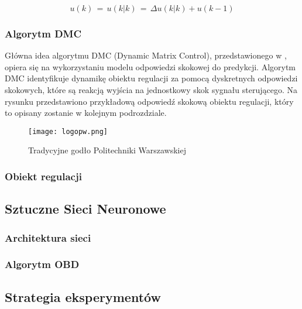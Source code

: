 \begin{equation}
u(k) \, = \, u(k|k) \, = \, \Delta u(k|k) + u(k-1)
\end{equation}

\subsubsection{Algorytm DMC}
Główna idea algorytmu DMC (Dynamic Matrix Control), przedstawionego w \cite{dmc1979}, opiera się na wykorzystaniu modelu odpowiedzi skokowej do predykcji. Algorytm DMC identyfikuje dynamikę obiektu regulacji za pomocą dyskretnych odpowiedzi skokowych, które są reakcją wyjścia na jednostkowy skok sygnału sterującego. Na rysunku przedstawiono przykładową odpowiedź skokową obiektu regulacji, który to opisany zostanie w kolejnym podrozdziale.
\begin{figure}[!h]
    \label{fig:tradycyjne-logo-pw}
    \centering \texttt{[image: logopw.png]}
    \caption{Tradycyjne godło Politechniki Warszawskiej}
\end{figure}


\subsubsection{Obiekt regulacji}


\subsection{Sztuczne Sieci Neuronowe}

\subsubsection{Architektura sieci}

\subsubsection{Algorytm OBD}

\subsection{Strategia eksperymentów}

